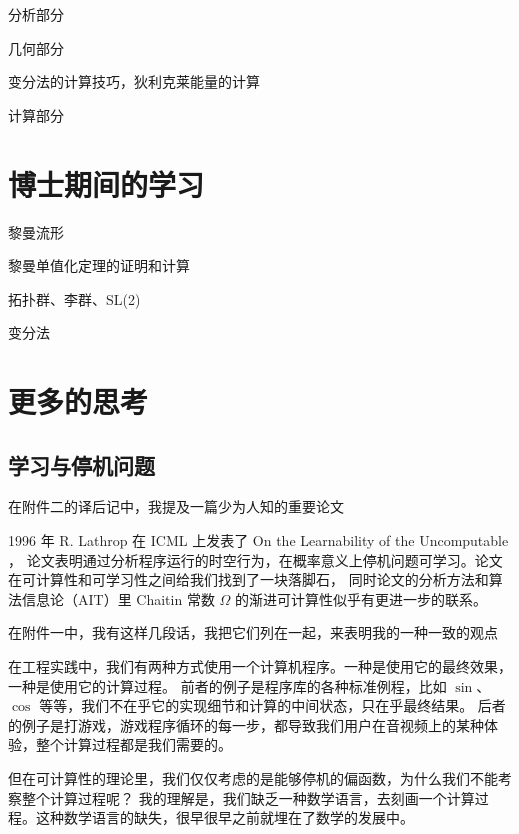 \documentclass[a4paper,12pt]{article}
\numberwithin{problem}{section}
\numberwithin{definition}{section}
\numberwithin{lemma}{section}
\numberwithin{proposition}{section}
\numberwithin{theorem}{section}
\numberwithin{grammar}{section}
\numberwithin{program}{section}
\numberwithin{convention}{section}
\numberwithin{corollary}{section}
\begin{document}
分析部分


几何部分

变分法的计算技巧，狄利克莱能量的计算

计算部分

\newpage

\section{博士期间的学习}

黎曼流形

黎曼单值化定理的证明和计算

拓扑群、李群、SL(2)

变分法

\newpage

\section{更多的思考}

\subsection{学习与停机问题}

在附件二的译后记中，我提及一篇少为人知的重要论文

\begin{displayquote}
1996 年 R. Lathrop 在 ICML 上发表了 On the Learnability of the Uncomputable ，
论文表明通过分析程序运行的时空行为，在概率意义上停机问题可学习。论文在可计算性和可学习性之间给我们找到了一块落脚石，
同时论文的分析方法和算法信息论（AIT）里 Chaitin 常数 $\Omega$ 的渐进可计算性似乎有更进一步的联系。
\end{displayquote}

在附件一中，我有这样几段话，我把它们列在一起，来表明我的一种一致的观点

\begin{displayquote}
在工程实践中，我们有两种方式使用一个计算机程序。一种是使用它的最终效果，一种是使用它的计算过程。
前者的例子是程序库的各种标准例程，比如 $\sin$、$\cos$ 等等，我们不在乎它的实现细节和计算的中间状态，只在乎最终结果。
后者的例子是打游戏，游戏程序循环的每一步，都导致我们用户在音视频上的某种体验，整个计算过程都是我们需要的。
\end{displayquote}

但在可计算性的理论里，我们仅仅考虑的是能够停机的偏函数，为什么我们不能考察整个计算过程呢？
我的理解是，我们缺乏一种数学语言，去刻画一个计算过程。这种数学语言的缺失，很早很早之前就埋在了数学的发展中。
\end{document}
